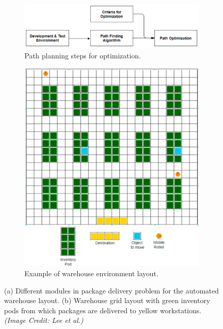 \documentclass{article}
\begin{document}
\begin{figure}
\centering
\begin{subfigure}[b]{0.4\textwidth}
   \includegraphics[width=1\linewidth]{path-planning-problem.png}
   \caption{Path planning steps for optimization.}
   \label{fig:abstract-opt-prob} 
\end{subfigure}

\begin{subfigure}[b]{0.4\textwidth}
   \includegraphics[width=1\linewidth]{warehouse-layout.png}
   \caption{Example of warehouse environment layout.}
   \label{fig:warehouse-layout}
\end{subfigure}

\caption[Path planning on warehouse layout]{(a) Different modules in package delivery problem for the automated warehouse layout. (b) Warehouse grid layout with green inventory pods from which packages are delivered to yellow workstations. \textit{(Image Credit: Lee et al.)}}
\end{figure}
\end{document}
